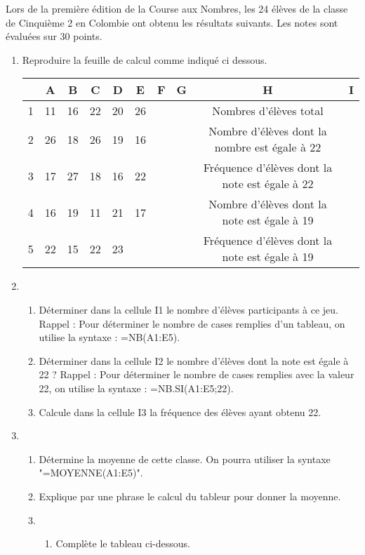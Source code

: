 
Lors de la première édition de la Course aux Nombres, les 24 élèves de la classe de Cinquième 2 en Colombie ont obtenu les résultats suivants. Les notes sont évaluées sur 30 points.


\begin{enumerate}
\item Reproduire la feuille de calcul comme indiqué ci dessous.

\begin{tabular}{|c|c|c|c|c|c|c|c|c|c|}
\hline 
\rowcolor{gray} & A & B & C & D & E & F & G & H & I \\ 
\hline 
\cellcolor{gray} 1 & 11 & 16 & 22 & 20 & 26 &  &  & Nombres d'élèves total &  \\ 
\hline 
\cellcolor{gray}2& 26 & 18 & 26 & 19& 16 &  &  & Nombre d'élèves dont la nombre est égale à 22 &  \\ 
\hline 
\cellcolor{gray}3 & 17 &27 & 18 & 16 & 22 &  & & Fréquence d'élèves dont la note est égale à 22 &  \\ 
\hline 
\cellcolor{gray}4 & 16 & 19 & 11 & 21 & 17 & &  & Nombre d'élèves dont la note est égale à 19 &  \\ 
\hline 
\cellcolor{gray}5 & 22 & 15 & 22 & 23 &  &  &  & Fréquence d'élèves dont la note est égale à 19 &  \\ 
\hline 
\end{tabular} 

\item  
\begin{enumerate}
\item  Déterminer dans la cellule I1 le nombre d'élèves participants à ce jeu. 
Rappel : Pour déterminer le nombre de cases remplies d'un tableau, on utilise la syntaxe : =NB(A1:E5). 
\item  Déterminer dans la cellule I2 le nombre d'élèves dont la note est égale à 22 ? 
Rappel : Pour déterminer le nombre de cases remplies avec la valeur 22, on utilise la syntaxe : =NB.SI(A1:E5;22). 
\item  Calcule dans la cellule I3 la fréquence des élèves ayant obtenu 22.
\end{enumerate}
\item  
\begin{enumerate}
\item Détermine la moyenne de cette classe. On pourra utiliser la syntaxe "=MOYENNE(A1:E5)".
\item Explique par une phrase le calcul du tableur pour donner la moyenne.
\item 
\begin{enumerate}
\item Complète le tableau ci-dessous.


\end{enumerate}
\end{enumerate}
\end{enumerate}
